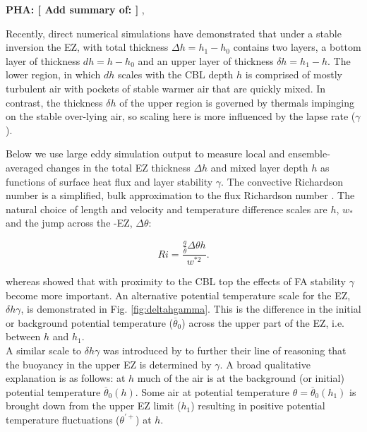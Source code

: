 \documentclass[referee]{svjour3}
\newcommand{\remarkpha}[1]{{ \bf PHA:  [ \footnotesize #1 ]}}
\begin{document}
\remarkpha{Add summary of: } \citet{BrooksFowler2}, \citet{FedConzMir04}


Recently,  direct numerical simulations \citep{GarciaMellado} have  demonstrated that under a stable inversion the  EZ, with total thickness $\Delta h=h_1 - h_0$  contains two layers, a bottom layer of thickness $d h= h-h_0$ and an upper layer of thickness $\delta h=h_1 - h$.   The lower region, in which $d h$ scales with the CBL depth $h$  is comprised of mostly turbulent air with pockets of stable warmer air that are quickly mixed. In contrast, the thickness $\delta h$ of the upper region is governed by thermals impinging on the stable over-lying air, so scaling here is more influenced by the lapse rate ($\gamma$).  

Below we use large eddy simulation output to measure local and ensemble-averaged changes in the total EZ thickness $\Delta h$ and mixed layer depth $h$ as functions of surface heat flux and layer stability $\gamma$.  The convective Richardson number is a simplified, bulk approximation to the flux Richardson number \citep{Stull-BLMetIntro}.  The natural choice of length and velocity and temperature difference scales are $h$, $w_{*}$ and the jump across the -EZ, $\Delta \theta$:

\begin{equation}
Ri = \frac{\frac{g}{\overline{\theta}} \Delta \theta h}{w^{*2}}.
\end{equation}



whereas \cite{Sorbjan1} showed that with proximity to the CBL top the effects of FA stability $\gamma$ become more important.  An alternative potential temperature scale for the EZ, $\delta h \gamma$, is demonstrated in Fig. \ref{fig:deltahgamma}. This is the difference in the initial or background potential temperature ($\overline{\theta}_{0}$) across the upper part of the EZ, i.e. between $h$ and $h_{1}$.\\      

A similar scale to $\delta h \gamma$ was introduced by \cite{GarciaMellado} to further their line of reasoning that the buoyancy in the upper EZ is determined by $\gamma$. A broad qualitative explanation is as follows: at $h$ much of the air is at the background (or initial) potential temperature $\overline{\theta}_{0}(h)$.  Some air at potential temperature $\theta = \overline{\theta}_{0}(h_{1})$ is brought down from the upper EZ limit ($h_{1}$) resulting in positive potential temperature fluctuations ($\theta^{'+}$) at $h$.\\
\end{document}
